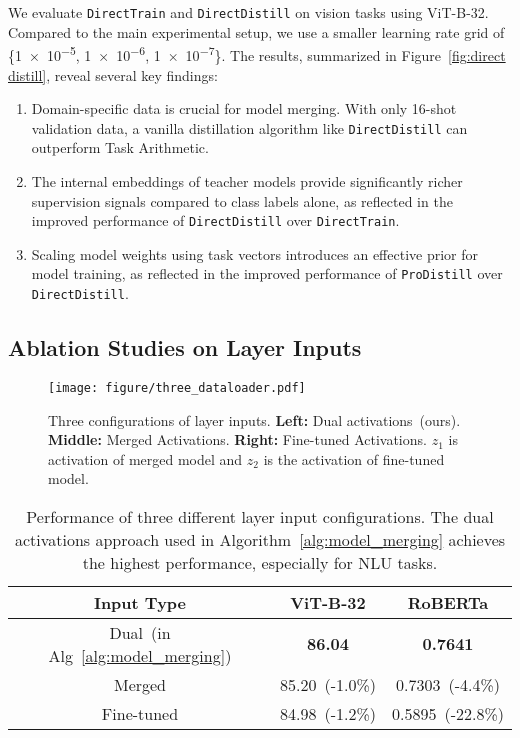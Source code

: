 We evaluate \texttt{DirectTrain} and \texttt{DirectDistill} on vision tasks using ViT-B-32. Compared to the main experimental setup, we use a smaller learning rate grid of \{\num{1e-5}, \num{1e-6}, \num{1e-7}\}. The results, summarized in Figure~\ref{fig:direct distill}, reveal several key findings:
\begin{enumerate} 
\item Domain-specific data is crucial for model merging. With only 16-shot validation data, a vanilla distillation algorithm like \texttt{DirectDistill} can outperform Task Arithmetic. 
\item The internal embeddings of teacher models provide significantly richer supervision signals compared to class labels alone, as reflected in the improved performance of \texttt{DirectDistill} over \texttt{DirectTrain}. 
\item Scaling model weights using task vectors introduces an effective prior for model training, as reflected in the improved performance of \texttt{ProDistill} over \texttt{DirectDistill}. 
\end{enumerate}



\subsection{Ablation Studies on Layer Inputs}
\label{apx: layer input}

\begin{figure}[!h]
    \centering
    \texttt{[image: figure/three\_dataloader.pdf]}
    \caption{Three configurations of layer inputs. \textbf{Left:} Dual activations~(ours). \textbf{Middle:} Merged Activations. \textbf{Right:} Fine-tuned Activations. $z_1$ is activation of merged model and $z_2$ is the activation of fine-tuned model.}
    \label{fig:three_dataloader}
\end{figure}

\begin{table}[t]
\centering
\begin{tabular}{c|cc}
\toprule
Input Type & ViT-B-32 & RoBERTa \\
\midrule
\rowcolor{lightyellow}
Dual~(in Alg~\ref{alg:model_merging}) & \textbf{86.04} & \textbf{0.7641} \\
Merged & 85.20~(-1.0\%) & 0.7303~(-4.4\%) \\
Fine-tuned & 84.98~(-1.2\%) & 0.5895~(-22.8\%) \\
\bottomrule
\end{tabular}
\caption{Performance of three different layer input configurations. The dual activations approach used in Algorithm~\ref{alg:model_merging} achieves the highest performance, especially for NLU tasks. }
\label{tab:three_loader}
\end{table}

